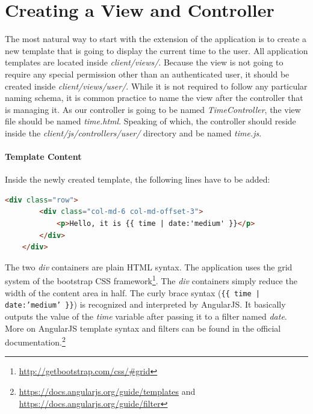 \documentclass[nochapterpage,nopartpage,noheadingspace,numbersubsubsec,bigchapter,colorback,accentcolor=tud9c,10pt]{tudreport}
\begin{document}
  \section{Creating a View and Controller}
  \label{sec:tech:handson:add-vc}

    The most natural way to start with the extension of the application is to create a new template that is going to display the current time to the user. All application templates are located inside \emph{client/views/}. Because the view is not going to require any special permission other than an authenticated user, it should be created inside \emph{client/views/user/}. While it is not required to follow any particular naming schema, it is common practice to name the view after the controller that is managing it. As our controller is going to be named \emph{TimeController}, the view file should be named \emph{time.html}. Speaking of which, the controller should reside inside the \emph{client/js/controllers/user/} directory and be named \emph{time.js}.

  \paragraph{Template Content}
    Inside the newly created template, the following lines have to be added:
        \begin{lstlisting}[language=html]
    <div class="row">
        <div class="col-md-6 col-md-offset-3">
            <p>Hello, it is {{ time | date:'medium' }}</p>
        </div>
    </div>
        \end{lstlisting}
    The two \emph{div} containers are plain HTML syntax. The application uses the grid system of the bootstrap CSS framework\footnote{\url{http://getbootstrap.com/css/\#grid}}. The \emph{div} containers simply reduce the width of the content area in half. The curly brace syntax (\texttt{\{\{ time | date:'medium' \}\}}) is recognized and interpreted by AngularJS. It basically outputs the value of the \emph{time} variable after passing it to a filter named \emph{date}. More on AngularJS template syntax and filters can be found in the official documentation.\footnote{\url{https://docs.angularjs.org/guide/templates} and \url{https://docs.angularjs.org/guide/filter}}
\end{document}

